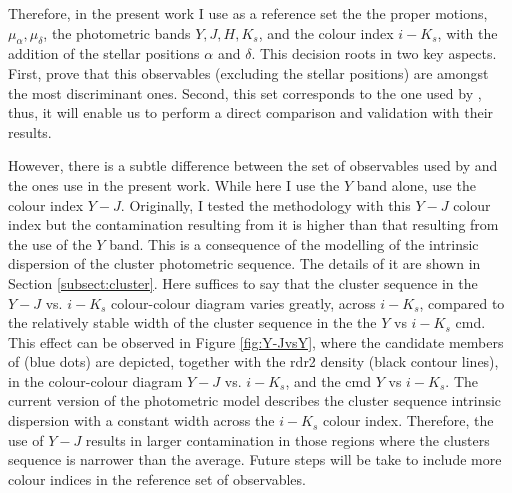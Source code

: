 Therefore, in the present work I use as a reference set the the proper motions, $\mu_{\alpha},\mu_{\delta}$, the photometric bands $Y,J,H,K_s$, and the colour index $i-K_s$, with the addition of the stellar positions  $\alpha$ and $\delta$. This decision roots in two key aspects. First,  \citet{Sarro2014} prove that this observables (excluding the stellar positions) are amongst the most discriminant ones. Second, this set corresponds to the one used by \cite{Bouy2015}, thus, it will enable us to perform a direct comparison and validation with their results. 

However, there is a subtle difference between the set of observables used by \cite{Bouy2015} and the ones use in the present work. While here I use the $Y$ band alone, \citet{Bouy2015} use the colour index $Y-J$. Originally, I tested the methodology with this $Y-J$ colour index but the contamination resulting from it is higher than that resulting from the use of the $Y$ band. This is a consequence of the modelling of the intrinsic dispersion of the cluster photometric sequence. The details of it are shown in Section \ref{subsect:cluster}. Here suffices to say that the cluster sequence in the $Y-J$ vs. $i-K_s$ colour-colour diagram varies greatly, across $i-K_s$, compared to the relatively stable width of the cluster sequence in the the $Y$ vs $i-K_s$ \gls{cmd}. This effect can be observed in Figure \ref{fig:Y-JvsY}, where the candidate members of \citet{Bouy2015} (blue dots) are depicted, together with the \gls{rdr2} density (black contour lines), in the colour-colour diagram $Y-J$ vs. $i-K_s$, and the  \gls{cmd} $Y$ vs $i-K_s$. The current version of the photometric model describes the cluster sequence intrinsic dispersion with a constant width across the $i-K_s$ colour index. Therefore, the use of $Y-J$ results in larger contamination in those regions where the clusters sequence is narrower than the average. Future steps will be take to include more colour indices in the reference set of observables.

